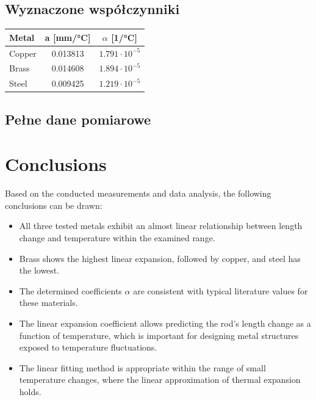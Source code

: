 \documentclass[a4paper,12pt]{article} %
\begin{document}
\subsection*{Wyznaczone współczynniki}

\begin{tabular}{l c c}
\toprule
Metal & a [mm/°C] & $\alpha$ [1/°C] \\
\midrule
Copper & 0.013813 & $1.791 \cdot 10^{-5}$ \\
Brass  & 0.014608 & $1.894 \cdot 10^{-5}$ \\
Steel  & 0.009425 & $1.219 \cdot 10^{-5}$ \\
\bottomrule
\end{tabular}

\subsection*{Pełne dane pomiarowe}


\section{Conclusions}

Based on the conducted measurements and data analysis, the following conclusions can be drawn:

\begin{itemize}
    \item All three tested metals exhibit an almost linear relationship between length change and temperature within the examined range.
    \item Brass shows the highest linear expansion, followed by copper, and steel has the lowest.
    \item The determined coefficients $\alpha$ are consistent with typical literature values for these materials.
    \item The linear expansion coefficient allows predicting the rod's length change as a function of temperature, which is important for designing metal structures exposed to temperature fluctuations.
    \item The linear fitting method is appropriate within the range of small temperature changes, where the linear approximation of thermal expansion holds.
\end{itemize}
\end{document}
